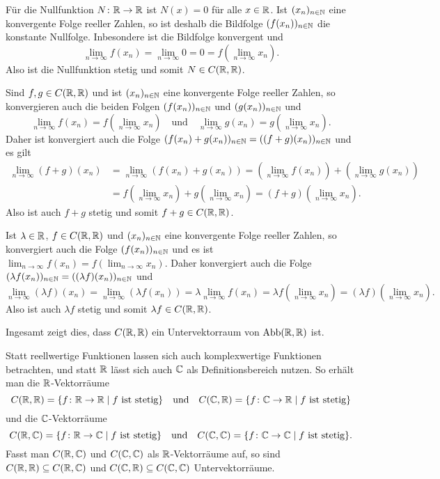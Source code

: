 Für die Nullfunktion $N \colon \mathbb{R} \to \mathbb{R}$ ist $N(x) = 0$ für alle $x \in \mathbb{R}$. Ist $(x_n)_{n \in \mathbb{N}}$ eine konvergente Folge reeller Zahlen, so ist deshalb die Bildfolge $(f(x_n))_{n \in \mathbb{N}}$ die konstante Nullfolge. Inbesondere ist die Bildfolge konvergent und
\[
 \lim_{n \to \infty} f(x_n)
 = \lim_{n \to \infty} 0
 = 0
 = f\left( \lim_{n \to \infty} x_n \right).
\]
Also ist die Nullfunktion stetig und somit $N \in C(\mathbb{R},\mathbb{R})$.

Sind $f,g \in C(\mathbb{R},\mathbb{R})$ und ist $(x_n)_{n \in \mathbb{N}}$ eine konvergente Folge reeller Zahlen, so konvergieren auch die beiden Folgen $(f(x_n))_{n \in \mathbb{N}}$ und $(g(x_n))_{n \in \mathbb{N}}$ und
\[
 \lim_{n \to \infty} f(x_n) = f\left( \lim_{n \to \infty} x_n \right)
 \quad\text{und}\quad
 \lim_{n \to \infty} g(x_n) = g\left( \lim_{n \to \infty} x_n \right).
\]
Daher ist konvergiert auch die Folge $(f(x_n) + g(x_n))_{n \in \mathbb{N}} = ((f+g)(x_n))_{n \in \mathbb{N}}$ und es gilt
\begin{align*}
 \lim_{n \to \infty} (f+g)(x_n)
 &= \lim_{n \to \infty} (f(x_n) + g(x_n))
 = \left(\lim_{n \to \infty} f(x_n)\right) + \left(\lim_{n \to \infty} g(x_n)\right) \\
 &=f\left( \lim_{n \to \infty} x_n \right) + g\left( \lim_{n \to \infty} x_n \right)
 = (f+g)\left( \lim_{n \to \infty} x_n \right).
\end{align*}
Also ist auch $f+g$ stetig und somit $f+g \in C(\mathbb{R}, \mathbb{R})$.

Ist $\lambda \in \mathbb{R}$, $f \in C(\mathbb{R}, \mathbb{R})$ und $(x_n)_{n \in \mathbb{N}}$ eine konvergente Folge reeller Zahlen, so konvergiert auch die Folge $(f(x_n))_{n \in \mathbb{N}}$ und es ist $\lim_{n \to \infty} f(x_n) = f(\lim_{n \to \infty} x_n)$. Daher konvergiert auch die Folge $(\lambda f(x_n))_{n \in \mathbb{N}} = ((\lambda f)(x_n))_{n \in \mathbb{N}}$ und
\[
 \lim_{n \to \infty} (\lambda f)(x_n)
 = \lim_{n \to \infty}( \lambda f(x_n) )
 = \lambda \lim_{n \to \infty} f(x_n)
 = \lambda f\left( \lim_{n \to \infty} x_n \right)
 = (\lambda f) \left( \lim_{n \to \infty} x_n \right).
\]
Also ist auch $\lambda f$ stetig und somit $\lambda f \in C(\mathbb{R}, \mathbb{R})$.

Ingesamt zeigt dies, dass $C(\mathbb{R}, \mathbb{R})$ ein Untervektorraum von $\mathrm{Abb}(\mathbb{R}, \mathbb{R})$ ist.


\begin{bem}
 Statt reellwertige Funktionen lassen sich auch komplexwertige Funktionen betrachten, und statt $\mathbb{R}$ lässt sich auch $\mathbb{C}$ als Definitionsbereich nutzen. So erhält man die $\mathbb{R}$-Vektorräume
 \[
  C(\mathbb{R},\mathbb{R}) = \{f \colon \mathbb{R} \to \mathbb{R} \mid \text{$f$ ist stetig}\}
  \quad\text{und}\quad
  C(\mathbb{C},\mathbb{R}) = \{f \colon \mathbb{C} \to \mathbb{R} \mid \text{$f$ ist stetig}\}
 \]
 und die $\mathbb{C}$-Vektorräume
 \[
  C(\mathbb{R},\mathbb{C}) = \{f \colon \mathbb{R} \to \mathbb{C} \mid \text{$f$ ist stetig}\}
  \quad\text{und}\quad
  C(\mathbb{C},\mathbb{C}) = \{f \colon \mathbb{C} \to \mathbb{C} \mid \text{$f$ ist stetig}\}.
 \]
 Fasst man $C(\mathbb{R}, \mathbb{C})$ und $C(\mathbb{C}, \mathbb{C})$ als $\mathbb{R}$-Vektorräume auf, so sind $C(\mathbb{R}, \mathbb{R}) \subseteq C(\mathbb{R}, \mathbb{C})$ und $C(\mathbb{C}, \mathbb{R}) \subseteq C(\mathbb{C}, \mathbb{C})$ Untervektorräume.
\end{bem}



